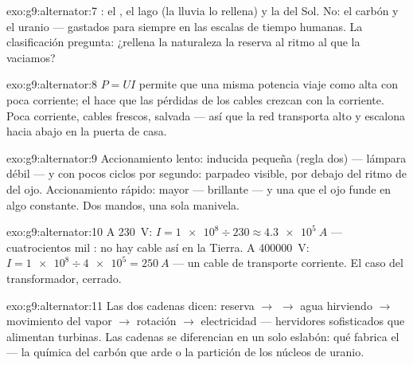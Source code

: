 \begin{solution}{exo:g9:alternator:7}
: el , el lago (la lluvia lo rellena) y la
 del Sol. No: el carbón y el uranio --- gastados para siempre en las
escalas de tiempo humanas. La clasificación pregunta: ¿rellena la
naturaleza la reserva al ritmo al que la vaciamos?
\end{solution}

\begin{solution}{exo:g9:alternator:8}
$P = U I$ permite que una misma potencia viaje como
 alta con poca corriente; el  hace
que las pérdidas de los cables crezcan con la corriente. Poca
corriente, cables frescos,  salvada --- así que la red
transporta alto y escalona hacia abajo en la puerta de casa.
\end{solution}

\begin{solution}{exo:g9:alternator:9}
Accionamiento lento:  inducida pequeña (regla dos) ---
lámpara débil --- y con pocos ciclos por segundo: parpadeo visible, por
debajo del ritmo de  del ojo. Accionamiento rápido:
 mayor --- brillante --- y una  que el
ojo funde en algo constante. Dos mandos, una sola manivela.
\end{solution}

\begin{solution}{exo:g9:alternator:10}
A \qty{230}{V}: $I = \num{1e8} \div 230 \approx \qty{4.3e5}{A}$ ---
cuatrocientos mil : no hay cable así en la Tierra. A
\qty{400000}{V}: $I = \num{1e8} \div \num{4e5} = \qty{250}{A}$ --- un
cable de transporte corriente. El caso del transformador, cerrado.
\end{solution}

\begin{solution}{exo:g9:alternator:11}
Las dos cadenas dicen: reserva $\to$  $\to$ agua hirviendo
$\to$ movimiento del vapor $\to$ rotación $\to$ electricidad ---
hervidores sofisticados que alimentan turbinas. Las cadenas se
diferencian en un solo eslabón: qué fabrica el  --- la química
del carbón que arde o la partición de los núcleos de uranio.
\end{solution}

